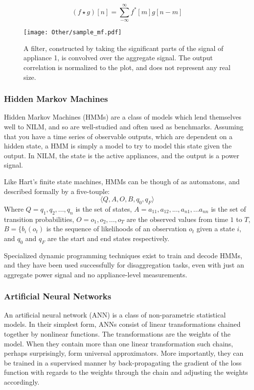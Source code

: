 \documentclass[12pt, american]{article}
\begin{document}
\begin{equation}
(f\star g)[n] = \sum\limits_{-\infty}^{\infty} f^*[m]g[n-m]
\label{eq:cross_corr}
\end{equation}

\begin{figure}[h]
\centering
\def\svgwidth{\columnwidth}
\caption{A filter, constructed by taking the significant parts of the signal of appliance 1, is convolved over the aggregate signal. The output correlation is normalized to the plot, and does not represent any real size.}
\texttt{[image: Other/sample\_mf.pdf]}
\label{fig:matched_filter_1}
\end{figure}

\subsubsection{Hidden Markov Machines}
\label{sec:hmm}
Hidden Markov Machines (HMMs) are a class of models which lend themselves well to NILM, and so are well-studied and often used as benchmarks. Assuming that you have a time series of  observable outputs, which are dependent on a hidden state, a HMM is simply a model to try to model this state given the output. In NILM, the state is the active appliances, and the output is a power signal.

Like Hart's finite state machines, HMMs can be though of as automatons, and described formally by a five-touple: 
\begin{equation}
\label{eq:hmm_touple}
\langle Q, A, O, B, q_{0}, q_{F}\rangle
\end{equation}
Where $Q = q_{1},q_{2},...,q_{n}$ is the set of states, $A = a_{11},a_{12},...,a_{n1},...a_{nn}$ is the set of transition probabilities, $O = o_{1},o_{2},...,o_{T}$ are the observed values from time $1$ to $T$, $B = \{b_{i}(o_{t})$ is the sequence of likelihoods of an observation $o_{t}$ given a state $i$, and $q_{0}$ and $q_{F}$ are the start and end states respectively.

Specialized dynamic programming techniques exist to train and decode HMMs, and they have been used successfully for disaggregation tasks, even with just an aggregate power signal and no appliance-level measurements\cite{Jia2015}.

\subsubsection{Artificial Neural Networks}
\label{sec:ann}
An artificial neural network (ANN) is a class of  non-parametric statistical models. In their simplest form, ANNs consist of linear transformations chained together by nonlinear functions. The transformations are the weights of the model. When they contain more than one linear transformation such chains, perhaps surprisingly, form universal approximators. More importantly, they can be trained in a supervised manner by back-propagating the gradient of the loss function with regards to the weights through the chain and adjusting the weights accordingly\cite{Rumelhart1986}.
\end{document}
